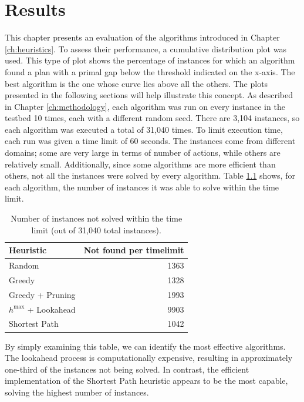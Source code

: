 \chapter{Results}
\label{ch:results}
This chapter presents an evaluation of the algorithms introduced in Chapter \ref{ch:heuristics}.
To assess their performance, a cumulative distribution plot was used.
This type of plot shows the percentage of instances for which an algorithm found a plan with a
primal gap below the threshold indicated on the x-axis.
The best algorithm is the one whose curve lies above all the others.
The plots presented in the following sections will help illustrate this concept.
As described in Chapter \ref{ch:methodology}, each algorithm was run on every instance in the
testbed 10 times, each with a different random seed.
There are 3,104 instances, so each algorithm was executed a total of 31,040 times.
To limit execution time, each run was given a time limit of 60 seconds. The instances
come from different domains; some are very large in terms of number of actions, while others are
relatively small.
Additionally, since some algorithms are more efficient than others, not all the instances
were solved by every algorithm. Table \ref{tab:timelimit} shows, for each algorithm,
the number of instances it was able to solve within the time limit.

\begin{table}[ht]
	\centering
	\begin{tabular}{|l|r|}
		\hline
		\textbf{Heuristic}     & \textbf{Not found per timelimit} \\
		\hline
		Random                 & 1363                             \\
		Greedy                 & 1328                             \\
		Greedy + Pruning       & 1993                             \\
		$h^{\max}$ + Lookahead & 9903                             \\
		Shortest Path          & 1042                             \\
		\hline
	\end{tabular}
	\caption{Number of instances not solved within the time limit (out of 31,040 total instances).}
	\label{tab:timelimit}
\end{table}

By simply examining this table, we can identify the most effective algorithms.
The lookahead process is computationally expensive, resulting in approximately one-third of the instances not being solved.
In contrast, the efficient implementation of the Shortest Path heuristic appears to be the most capable,
solving the highest number of instances.

